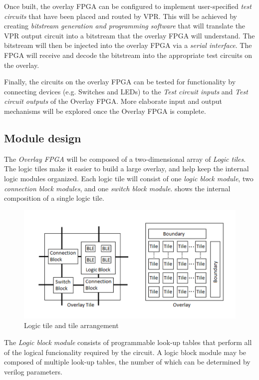 Once built, the overlay FPGA can be configured to implement user-specified \emph{test circuits} that have been placed and routed by VPR.
This will be achieved by creating \emph{bitstream generation and programming software} that will translate the VPR output circuit into a bitstream that the overlay FPGA will understand.
The bitstream will then be injected into the overlay FPGA via a \emph{serial interface}.
The FPGA will receive and decode the bitstream into the appropriate test circuits on the overlay.

Finally, the circuits on the overlay FPGA can be tested for functionality by connecting devices (e.g. Switches and LEDs) to the \emph{Test circuit inputs} and \emph{Test circuit outputs} of the Overlay FPGA.
More elaborate input and output mechanisms will be explored once the Overlay FPGA is complete.



\subsection{Module design}

The \emph{Overlay FPGA} will be composed of a two-dimensional array of \emph{Logic tiles}.
The logic tiles make it easier to build a large overlay, and help keep the internal 
logic modules organized.
Each logic tile will consist of one \emph{logic block module}, two \emph{connection block modules}, 
and one \emph{switch block module}.
 shows the internal composition of a single logic tile.

\begin{figure}[!h]
	\centering
	\includegraphics[scale=0.7]{overlay.png}
	\caption{Logic tile and tile arrangement}
	\label{tile-diagram}
\end{figure}

The \emph{Logic block module} consists of programmable look-up tables that perform all of the logical 
funcionality required by the circuit.
A logic block module may be composed of multiple look-up tables, the number of which 
can be determined by verilog parameters.

